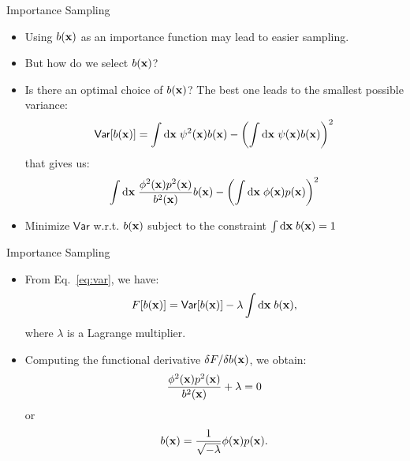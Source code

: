 \documentclass[10pt]{beamer}
\begin{document}
\begin{frame}{Importance Sampling}
\begin{itemize}
\setlength\itemsep{1em}
  \item Using $b({\bf x})$ as an importance function may lead to easier sampling.

  \item But how do we select $b({\bf x})$?

  \item Is there an optimal choice of $b({\bf x})$? The best one leads to the smallest possible variance:
  \begin{equation}
    \textsf{Var}[b({\bf x})] = \int\mathrm{d}{\bf x}\; \psi^2({\bf x}) b({\bf x}) - \left( \int\mathrm{d}{\bf x}\; \psi({\bf x}) b({\bf x}) \right)^2
  \end{equation}
  that gives us:
  \begin{equation}
  \label{eq:var}
    \int\mathrm{d}{\bf x}\; \frac{\phi^2({\bf x}) p^2({\bf x})}{b^2({\bf x})} b({\bf x}) - \left( \int\mathrm{d}{\bf x}\; \phi({\bf x}) p({\bf x}) \right)^2
  \end{equation}

  \item Minimize $\textsf{Var}$ w.r.t. $b({\bf x})$ subject to the constraint $\int\mathrm{d}{\bf x}\; b({\bf x})=1$
\end{itemize}
\end{frame}

\begin{frame}{Importance Sampling}
\begin{itemize}
\setlength\itemsep{1em}
  \item From Eq.~\ref{eq:var}, we have:
  \begin{equation}
    F[b({\bf x})] = \textsf{Var}[b({\bf x})] - \lambda \int\mathrm{d}{\bf x}\; b({\bf x}),
  \end{equation}
  where $\lambda$ is a Lagrange multiplier.

  \item Computing the functional derivative $\delta F/\delta b({\bf x})$, we obtain:
  \begin{equation}
    \frac{\phi^2({\bf x}) p^2({\bf x})}{b^2({\bf x})} + \lambda = 0
  \end{equation}
  or
  \begin{equation}
    b({\bf x}) = \frac{1}{\sqrt{-\lambda}} \phi({\bf x}) p({\bf x}).
  \end{equation}
\end{itemize}
\end{frame}
\end{document}

